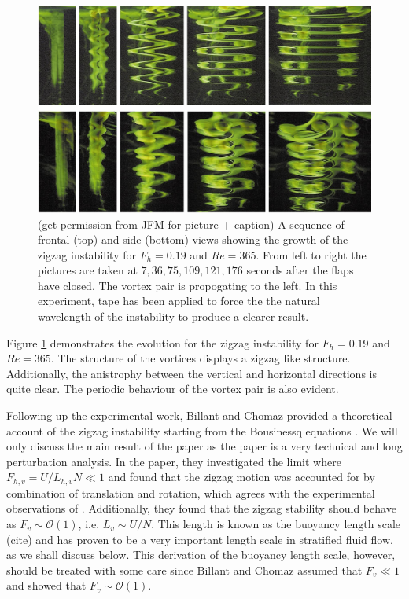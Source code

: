\begin{figure}
\begin{center}
\includegraphics[width=\textwidth]{zigzag_experimental.pdf}
\caption{(get permission from JFM for picture + caption) A sequence of frontal (top) and side (bottom) views showing the growth of the zigzag instability for $F_{h}=0.19$ and $Re=365$. From left to right the pictures are taken at $7,36,75,109,121,176$ seconds after the flaps have closed. The vortex pair is propogating to the left. In this experiment, tape has been applied to force the the natural wavelength of the instability to produce a clearer result.}
\label{zigzag_experimental}
\end{center}
\end{figure}
Figure \ref{zigzag_experimental} demonstrates the evolution for the zigzag instability for $F_{h}=0.19$ and $Re=365$. The structure of the vortices displays a zigzag like structure. Additionally, the anistrophy between the vertical and horizontal directions is quite clear. The periodic behaviour of the vortex pair is also evident. 



Following up the experimental work, Billant and Chomaz provided a theoretical account of the zigzag instability starting from the Bousinessq equations \cite{bc2000b}. We will only discuss the main result of the paper as the paper is a very technical and long perturbation analysis. In the paper, they investigated the limit where $F_{h,v} = U/L_{h,v}N \ll 1$ and found that the zigzag motion was accounted for by combination of translation and rotation, which agrees with the experimental observations of \cite{bc2000a}. Additionally, they found that the zigzag stability should behave as $F_{v} \sim \mathcal{O}(1)$, i.e. $L_{v} \sim U/N$. This length is known as the buoyancy length scale (cite) and has proven to be a very important length scale in stratified fluid flow, as we shall discuss below. This derivation of the buoyancy length scale, however,  should be treated with some care since Billant and Chomaz assumed that $F_{v}\ll 1$ and showed that $F_{v}\sim \mathcal{O}(1)$. 

